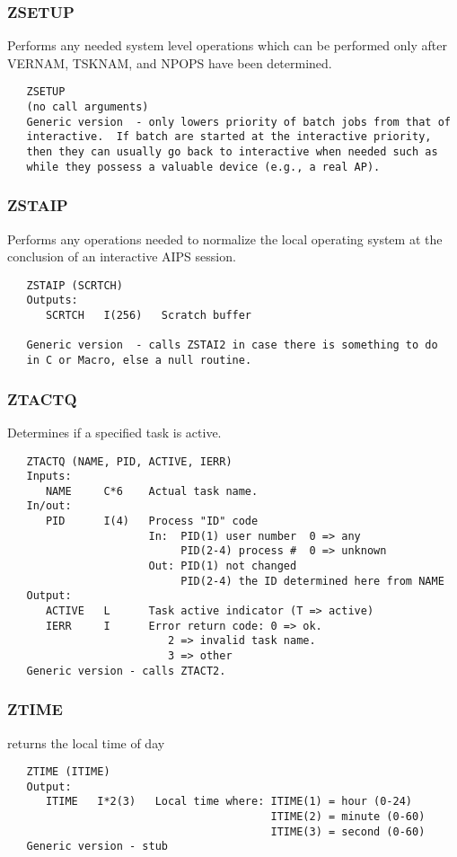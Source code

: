 \subsubsection{ZSETUP}
Performs any needed system level operations which can be
performed only after VERNAM, TSKNAM, and NPOPS have been determined.
\begin{verbatim}
   ZSETUP
   (no call arguments)
   Generic version  - only lowers priority of batch jobs from that of
   interactive.  If batch are started at the interactive priority,
   then they can usually go back to interactive when needed such as
   while they possess a valuable device (e.g., a real AP).
\end{verbatim}

\subsubsection{ZSTAIP}
Performs any operations needed to normalize the local
operating system at the conclusion of an interactive AIPS session.
\begin{verbatim}
   ZSTAIP (SCRTCH)
   Outputs:
      SCRTCH   I(256)   Scratch buffer

   Generic version  - calls ZSTAI2 in case there is something to do
   in C or Macro, else a null routine.
\end{verbatim}

\subsubsection{ZTACTQ}
Determines if a specified task is active.
\begin{verbatim}
   ZTACTQ (NAME, PID, ACTIVE, IERR)
   Inputs:
      NAME     C*6    Actual task name.
   In/out:
      PID      I(4)   Process "ID" code
                      In:  PID(1) user number  0 => any
                           PID(2-4) process #  0 => unknown
                      Out: PID(1) not changed
                           PID(2-4) the ID determined here from NAME
   Output:
      ACTIVE   L      Task active indicator (T => active)
      IERR     I      Error return code: 0 => ok.
                         2 => invalid task name.
                         3 => other
   Generic version - calls ZTACT2.
\end{verbatim}

\subsubsection{ZTIME}
returns the local time of day
\begin{verbatim}
   ZTIME (ITIME)
   Output:
      ITIME   I*2(3)   Local time where: ITIME(1) = hour (0-24)
                                         ITIME(2) = minute (0-60)
                                         ITIME(3) = second (0-60)
   Generic version - stub
\end{verbatim}

